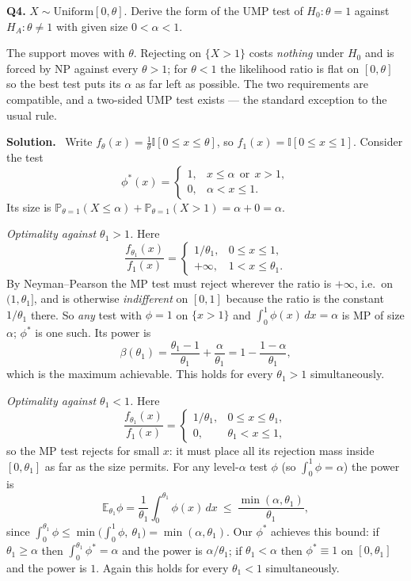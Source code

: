 \documentclass[11pt]{article}
\newcommand{\E}{\mathbb{E}}
\newcommand{\Prob}{\mathbb{P}}
\newenvironment{prob}[1]{\medskip\noindent\textbf{\large #1}\quad}{\par}
\newcommand{\soln}{\medskip\noindent\textbf{Solution.}\ }
\begin{document}
\bigskip
\begin{prob}{Q4.}
$X\sim\mathrm{Uniform}[0,\theta]$. Derive the form of the UMP test of $H_0:\theta=1$ against
$H_A:\theta\ne1$ with given size $0<\alpha<1$.
\end{prob}

\begin{ideabox}
The support moves with $\theta$. Rejecting on $\{X>1\}$ costs \emph{nothing} under $H_0$ and is
forced by NP against every $\theta>1$; for $\theta<1$ the likelihood ratio is flat on $[0,\theta]$
so the best test puts its $\alpha$ as far left as possible. The two requirements are compatible,
and a two-sided UMP test exists --- the standard exception to the usual rule.
\end{ideabox}

\soln
Write $f_\theta(x)=\tfrac1\theta\mathbb{I}[0\le x\le\theta]$, so $f_1(x)=\mathbb{I}[0\le x\le1]$.
Consider the test
\[
\boxed{\ \phi^*(x)=\begin{cases}1,& x\le\alpha\ \ \text{or}\ \ x>1,\\ 0,&\alpha<x\le1.\end{cases}\ }
\]
Its size is $\Prob_{\theta=1}(X\le\alpha)+\Prob_{\theta=1}(X>1)=\alpha+0=\alpha$. \checkmark

\emph{Optimality against $\theta_1>1$.} Here
\[
\frac{f_{\theta_1}(x)}{f_1(x)}=\begin{cases}1/\theta_1,&0\le x\le1,\\[2pt] +\infty,&1<x\le\theta_1.\end{cases}
\]
By Neyman--Pearson the MP test must reject wherever the ratio is $+\infty$, i.e.\ on
$(1,\theta_1]$, and is otherwise \emph{indifferent} on $[0,1]$ because the ratio is the constant
$1/\theta_1$ there. So \emph{any} test with $\phi=1$ on $\{x>1\}$ and
$\int_0^1\phi(x)\,dx=\alpha$ is MP of size $\alpha$; $\phi^*$ is one such. Its power is
\[
\beta(\theta_1)=\frac{\theta_1-1}{\theta_1}+\frac{\alpha}{\theta_1}
=1-\frac{1-\alpha}{\theta_1},
\]
which is the maximum achievable. This holds for every $\theta_1>1$ simultaneously.

\emph{Optimality against $\theta_1<1$.} Here
\[
\frac{f_{\theta_1}(x)}{f_1(x)}=\begin{cases}1/\theta_1,&0\le x\le\theta_1,\\ 0,&\theta_1<x\le1,\end{cases}
\]
so the MP test rejects for small $x$: it must place all its rejection mass inside $[0,\theta_1]$
as far as the size permits. For any level-$\alpha$ test $\phi$ (so $\int_0^1\phi=\alpha$) the
power is
\[
\E_{\theta_1}\phi=\frac{1}{\theta_1}\int_0^{\theta_1}\phi(x)\,dx
\ \le\ \frac{\min(\alpha,\theta_1)}{\theta_1},
\]
since $\int_0^{\theta_1}\phi\le\min\big(\int_0^1\phi,\ \theta_1\big)=\min(\alpha,\theta_1)$.
Our $\phi^*$ achieves this bound: if $\theta_1\ge\alpha$ then
$\int_0^{\theta_1}\phi^*=\alpha$ and the power is $\alpha/\theta_1$; if $\theta_1<\alpha$ then
$\phi^*\equiv1$ on $[0,\theta_1]$ and the power is $1$. Again this holds for every
$\theta_1<1$ simultaneously.
\end{document}
